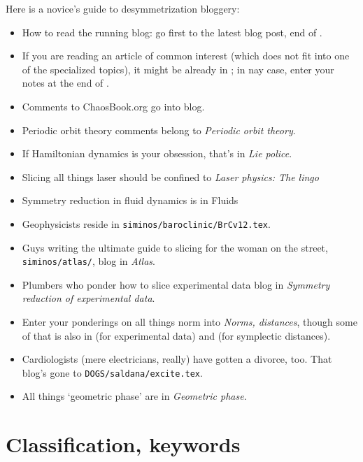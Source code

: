 Here is a novice's guide to desymmetrization bloggery:
\begin{itemize}
  \item
How to read the running blog: go first to the latest blog post, end
of .
  \item
If you are reading an article of common interest (which does not fit into
one of the specialized topics), it might be already in ;
in nay case, enter your notes at the end of .
  \item
Comments to ChaosBook.org go into  blog.
  \item
Periodic orbit theory comments belong to  {\em
Periodic orbit theory}.
  \item
If Hamiltonian dynamics is your obsession, that's in
 {\em Lie police}.
  \item
Slicing all things laser should be confined to
 {\em Laser physics: The lingo}
  \item
Symmetry reduction in fluid dynamics is in  {Fluids}
  \item
Geophysicists reside in
\texttt{siminos/baroclinic/BrCv12.tex}.
  \item
Guys writing the ultimate guide to slicing for the woman on the street,
\texttt{siminos/atlas/}, blog in  {\em Atlas}.
  \item
Plumbers who ponder how to slice experimental data blog in
 {\em Symmetry reduction of experimental data}.
  \item
Enter your ponderings on all things norm into 
\emph{Norms, distances}, though some of that is also in 
(for experimental data) and  (for symplectic
distances).
  \item
Cardiologists (mere electricians, really) have gotten a divorce, too. That
blog's gone to \texttt{DOGS/saldana/excite.tex}.
  \item
All things `{geometric phase}' are in  {\em
Geometric phase}.

\end{itemize}


\section{Classification, keywords}

